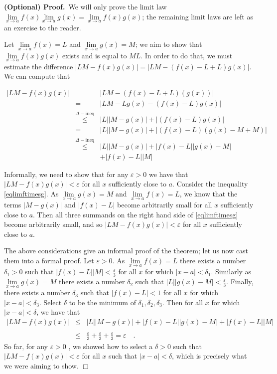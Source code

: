 \documentclass[12pt]{book}
\newenvironment{proofOptional}[1][]{ \noindent \textbf{(Optional) Proof#1.}}{$\Box$\medskip}
\begin{document}
\begin{proofOptional}~We will only prove the limit law $\displaystyle \lim\limits_{x\to a} f(x)\lim\limits_{x\to a}  g(x)= \lim\limits_{x\to a} f(x) g(x)$; the remaining limit laws are left as an exercise to the reader.

Let $\lim\limits_{x\to a}f(x)=L$ and $\lim\limits_{x\to a}g(x)=M$; we aim to show that $\lim\limits_{x\to a} f(x)g(x) $ exists and is equal to $M L$. In order to do that, we must estimate the difference $ |L M - f(x)g(x)|=|L M - (f(x)-L+L)g(x)|$. We can compute that

\begin{equation}\label{eqlimftimesg}
\begin{array}{rcl}
|L M - f(x)g(x)|&=&|L M - (f(x)-L+L)(g(x))|\\&=& |LM-L g(x) - (f(x)-L)g(x)  |\\& \stackrel{\Delta-\text{ineq}}{\leq}& |L||M-g(x)|+|(f(x)-L)g(x)| \\
&=& |L||M-g(x)|+|(f(x)-L)(g(x)-M+M)|\\
&\stackrel{\Delta-\text{ineq}}{\leq}& |L||M-g(x)|+ |f(x)-L||g(x)-M|
\\&&+ |f(x)-L||M|
\end{array}
\end{equation}

Informally, we need to show that for any $\varepsilon>0$ we have that $|LM-f(x)g(x)|<\varepsilon$ for all $x$ sufficiently close to $a$. Consider the inequality \eqref{eqlimftimesg}. As $\lim\limits_{x\to a} g(x)=M$ and $\lim\limits_{x\to a}f(x)=L $, we know that the terms $|M-g(x)|$ and $|f(x)-L|$ become arbitrarily small for all $x$ sufficiently close to $a$. Then all three summands on the right hand side of \eqref{eqlimftimesg} become arbitrarily small, and so $|LM-f(x)g(x)|<\varepsilon$ for all $x$ sufficiently close to $a$.

The above considerations give an informal proof of the theorem; let us now cast them into a formal proof. Let $\varepsilon>0$. As $\lim\limits_{x\to a}f(x)=L$ there exists a number $\delta_1>0$ such that $|f(x)-L| |M|<\frac{\varepsilon}3$ for all $x$ for which $|x-a|<\delta_1$. Similarly as $\lim\limits_{x\to a}g(x)=M$ there exists a number $\delta_2$ such that $|L||g(x)-M| <\frac{\varepsilon}3$. Finally, there exists a number $\delta_3$ such that $|f(x)-L|<1 $ for all  $x$ for which $|x-a|<\delta_3$. Select $\delta $ to be the minimum of $\delta_1, \delta_2, \delta_3$. Then  for all $x$ for which $|x-a|<\delta$, we have that
\[
\begin{array}{rcl}
\displaystyle |L M - f(x)g(x)|&\leq&\displaystyle |L||M-g(x)|+ |f(x)-L||g(x)-M|+ |f(x)-L||M| \\~\\&\leq&\displaystyle \frac{\varepsilon}{3}+\frac{\varepsilon}{3}+\frac{\varepsilon}{3}=\varepsilon\quad .
\end{array}
\]
So far, for any $\varepsilon>0$ , we showed how to select a $\delta>0$ such that $|LM-f(x)g(x)|<\varepsilon$ for all $x$ such that $|x-a|<\delta$, which is precisely what we were aiming to show.
\end{proofOptional}
\end{document}
